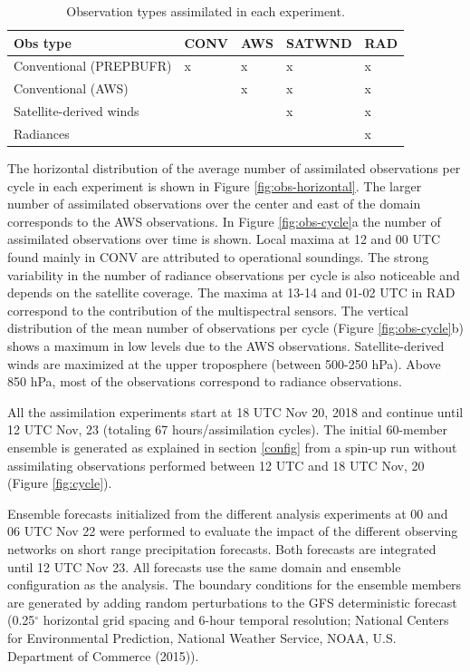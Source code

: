 \documentclass[authoryear,preprint,review,12pt]{elsarticle} %
\begin{document}
\begin{table}

\caption{\label{tab:table-exp}Observation types assimilated in each experiment.}
\centering
\begin{tabu} to 
\toprule
Obs type & CONV & AWS & SATWND & RAD\\
\midrule
Conventional (PREPBUFR) & x & x & x & x\\
Conventional (AWS) &  & x & x & x\\
Satellite-derived winds &  &  & x & x\\
Radiances &  &  &  & x\\
\bottomrule
\end{tabu}
\end{table}

The horizontal distribution of the average number of assimilated observations per cycle in each experiment is shown in Figure \ref{fig:obs-horizontal}. The larger number of assimilated observations over the center and east of the domain corresponds to the AWS observations. In Figure \ref{fig:obs-cycle}a the number of assimilated observations over time is shown. Local maxima at 12 and 00 UTC found mainly in CONV are attributed to operational soundings. The strong variability in the number of radiance observations per cycle is also noticeable and depends on the satellite coverage. The maxima at 13-14 and 01-02 UTC in RAD correspond to the contribution of the multispectral sensors. The vertical distribution of the mean number of observations per cycle (Figure \ref{fig:obs-cycle}b) shows a maximum in low levels due to the AWS observations. Satellite-derived winds are maximized at the upper troposphere (between 500-250 hPa). Above 850 hPa, most of the observations correspond to radiance observations.

All the assimilation experiments start at 18 UTC Nov 20, 2018 and continue until 12 UTC Nov, 23 (totaling 67 hours/assimilation cycles). The initial 60-member ensemble is generated as explained in section \ref{config} from a spin-up run without assimilating observations performed between 12 UTC and 18 UTC Nov, 20 (Figure \ref{fig:cycle}).

Ensemble forecasts initialized from the different analysis experiments at 00 and 06 UTC Nov 22 were performed to evaluate the impact of the different observing networks on short range precipitation forecasts. Both forecasts are integrated until 12 UTC Nov 23. All forecasts use the same domain and ensemble configuration as the analysis. The boundary conditions for the ensemble members are generated by adding random perturbations to the GFS deterministic forecast (0.25\(^{\circ}\) horizontal grid spacing and 6-hour temporal resolution; National Centers for Environmental Prediction, National Weather Service, NOAA, U.S. Department of Commerce (2015)).
\end{document}
